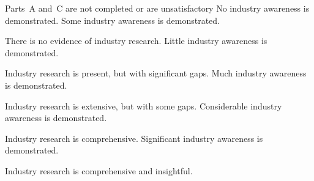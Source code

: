 \documentclass{../../fal_assignment}
\begin{document}
\begin{markingrubric}
		\grade\fail Parts~A and~C are not completed or are unsatisfactory
		\grade\fail No industry awareness is demonstrated.
		\grade Some industry awareness is demonstrated.
		\par There is no evidence of industry research.
		\grade Little industry awareness is demonstrated.
		\par Industry research is present, but with significant gaps.
		\grade Much industry awareness is demonstrated.
		\par Industry research is extensive, but with some gaps.
		\grade Considerable industry awareness is demonstrated.
		\par Industry research is comprehensive.
		\grade Significant industry awareness is demonstrated.
		\par Industry research is comprehensive and insightful.


\end{markingrubric}
\end{document}
